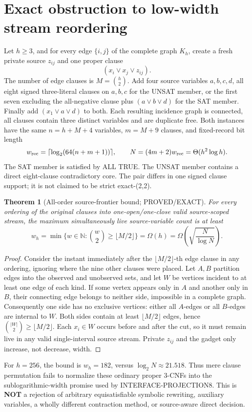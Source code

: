 \documentclass[11pt]{article}
\newtheorem{theorem}{Theorem}
\begin{document}
\section{Exact obstruction to low-width stream reordering}
Let \(h\ge3\), and for every edge \(\{i,j\}\) of the complete graph \(K_h\), create a fresh private source \(z_{ij}\) and one proper clause
\[
 (x_i\vee x_j\vee z_{ij}).
\]
The number of edge clauses is \(M=\binom h2\). Add four source variables \(a,b,c,d\), all eight signed three-literal clauses on \(a,b,c\) for the UNSAT member, or the first seven excluding the all-negative clause plus \((a\vee b\vee d)\) for the SAT member. Finally add \((x_1\vee a\vee d)\) to both. Each resulting incidence graph is connected, all clauses contain three distinct variables and are duplicate free. Both instances have the same \(n=h+M+4\) variables, \(m=M+9\) clauses, and fixed-record bit length
\[
 w_{\rm rec}=\lceil\log_2(64(n+m+1))\rceil,\qquad
 N=(4m+2)w_{\rm rec}=\Theta(h^2\log h).
\]
The SAT member is satisfied by ALL TRUE. The UNSAT member contains a direct eight-clause contradictory core. The pair differs in one signed clause support; it is not claimed to be strict exact-(2,2).

\begin{theorem}[All-order source-frontier bound; PROVED/EXACT]
For every ordering of the original clauses into one-open/one-close valid source-scoped stream, the maximum simultaneously live source-variable count is at least
\[
 w_h=\min\{w\in\mathbb{N}:\binom w2\ge\lfloor M/2\rfloor\}
 =\Omega(h)=\Omega\left(\sqrt{\frac N{\log N}}\right).
\]
\end{theorem}
\begin{proof}
Consider the instant immediately after the \(\lfloor M/2\rfloor\)-th edge clause in any ordering, ignoring where the nine other clauses were placed. Let \(A,B\) partition edges into the observed and unobserved sets, and let \(W\) be vertices incident to at least one edge of each kind. If some vertex appears only in \(A\) and another only in \(B\), their connecting edge belongs to neither side, impossible in a complete graph. Consequently one side has no exclusive vertices: either all \(A\)-edges or all \(B\)-edges are internal to \(W\). Both sides contain at least \(\lfloor M/2\rfloor\) edges, hence \(\binom{|W|}{2}\ge\lfloor M/2\rfloor\). Each \(x_i\in W\) occurs before and after the cut, so it must remain live in any valid single-interval source stream. Private \(z_{ij}\) and the gadget only increase, not decrease, width.
\end{proof}
For \(h=256\), the bound is \(w_h=182\), versus \(\log_2N\approx21.518\). Thus mere clause permutation fails to normalize these ordinary proper 3-CNFs into the sublogarithmic-width promise used by INTERFACE-PROJECTION8. This is \textbf{NOT} a rejection of arbitrary equisatisfiable symbolic rewriting, auxiliary variables, a wholly different contraction method, or source-aware direct decision.
\end{document}
